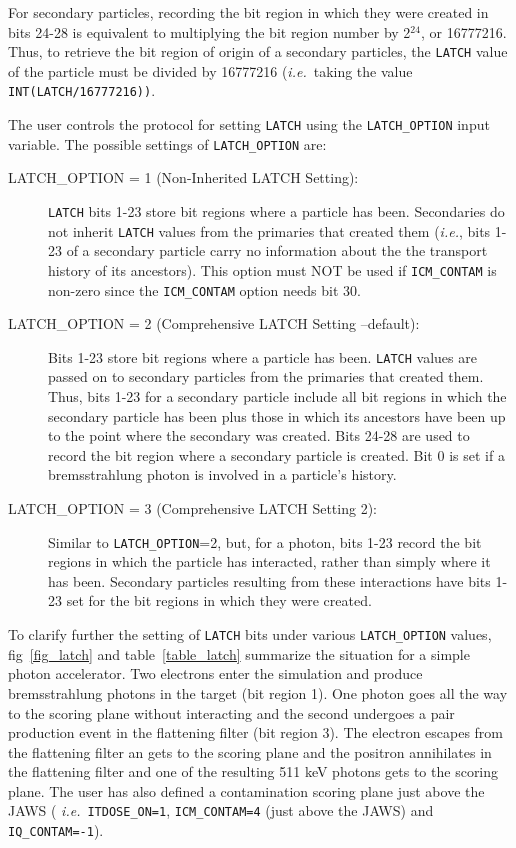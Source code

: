 \documentclass[12pt,twoside]{article}
\newcommand{\ie}{{\em i.e.}}
\begin{document}
For secondary particles, recording the bit region in which they were
created in bits 24-28 is equivalent to multiplying the bit region number by
2$^{24}$, or 16777216.  Thus, to retrieve the bit region of origin of a
secondary particles, the \verb+LATCH+ value of the particle must be divided by
16777216 (\ie\ taking the value \verb+INT(LATCH/16777216))+.

The user controls the protocol for setting \verb+LATCH+ using the
\verb+LATCH_OPTION+
input variable.  The possible settings of
\verb+LATCH_OPTION+ are:
\begin{description}

\item [LATCH\_OPTION = 1 (Non-Inherited LATCH Setting):]
{\tt LATCH} bits 1-23 store bit regions where a particle
has been.  Secondaries do not inherit \verb+LATCH+
values from the primaries that created them ({\em i.e.},
bits 1-23 of a secondary particle carry no information about the
the transport history of its ancestors).  This option must NOT be
used if \verb+ICM_CONTAM+ is non-zero since the \verb+ICM_CONTAM+ option
needs bit 30. 
\item [LATCH\_OPTION = 2 (Comprehensive LATCH Setting --default):]
Bits 1-23 store bit regions where a particle
has been.  \verb+LATCH+ values are passed on to
secondary particles from the primaries that created them.  Thus, bits 1-23
for a secondary particle include all bit regions in which the secondary
particle has been plus those in which its ancestors have been
up to the point where the secondary was created.  Bits
24-28 are used to record the bit region
where a secondary particle is created. Bit 0
is set if a bremsstrahlung photon is involved in a
 
particle's history.
\item [LATCH\_OPTION = 3 (Comprehensive LATCH Setting 2):]
Similar to {\tt LATCH\_OPTION}=2, but, for a photon,
bits 1-23 record the bit regions in which the particle has interacted,
rather than simply where it has been.  Secondary particles
resulting from these interactions have bits 1-23 set for the
bit regions in which they were created.
\end{description}

To clarify further the setting of \verb+LATCH+ bits under various
\verb+LATCH_OPTION+ values, fig~\ref{fig_latch} and table~\ref{table_latch}
summarize the situation for a simple photon accelerator.  Two electrons
enter the simulation and produce bremsstrahlung photons in the target (bit region 1).
One photon goes all the way to the scoring
plane without interacting and the second undergoes a pair production
event in the flattening filter (bit region 3). The electron escapes from
the flattening filter an gets to the scoring plane and the positron
annihilates in the flattening filter and one of the resulting 511 keV
photons gets to the scoring plane.  The user has also defined a
contamination scoring plane just above the JAWS ( \ie\
\verb+ITDOSE_ON=1+, \verb+ICM_CONTAM=4+ (just above the JAWS) and
\index{ICM\_CONTAM} \index{IQ\_CONTAM}
\verb+IQ_CONTAM=-1+).
\end{document}
